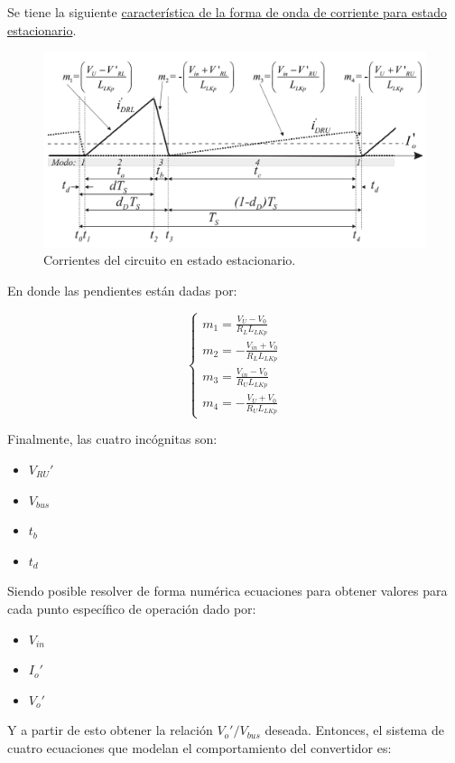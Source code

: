 Se tiene la siguiente \hyperref[fig:corrienteestacionario]{característica de la forma de onda de corriente para estado estacionario}.

\begin{figure}
	\centering
	\includegraphics[width=0.7\linewidth]{img/corrienteEstacionario}
	\caption{Corrientes del circuito en estado estacionario.}
	\label{fig:corrienteestacionario}
\end{figure}

En donde las pendientes están dadas por:

$$
\begin{cases}
	m_1 = \frac{V_U - V_0}{R_L L_{LKp}} \\
	m_2 = -\frac{V_{in} + V_0}{R_L L_{LKp}} \\
	m_3 = \frac{V_{in} - V_0}{R_U L_{LKp}} \\
	m_4 = -\frac{V_U + V_0}{R_U L_{LKp}}
\end{cases}
$$

Finalmente, las cuatro incógnitas son:

\begin{itemize}
	\item $V_{RU}'$
	\item $V_{bus}$
	\item $t_b$
	\item $t_d$
\end{itemize}

Siendo posible resolver de forma numérica ecuaciones para obtener valores para cada punto específico de operación dado por:

\begin{itemize}
	\item $V_{in}$
	\item $I_o'$
	\item $V_o'$
\end{itemize}

Y a partir de esto obtener la relación $V_o'/V_{bus}$ deseada. Entonces, el sistema de cuatro ecuaciones que modelan el comportamiento del convertidor es:

